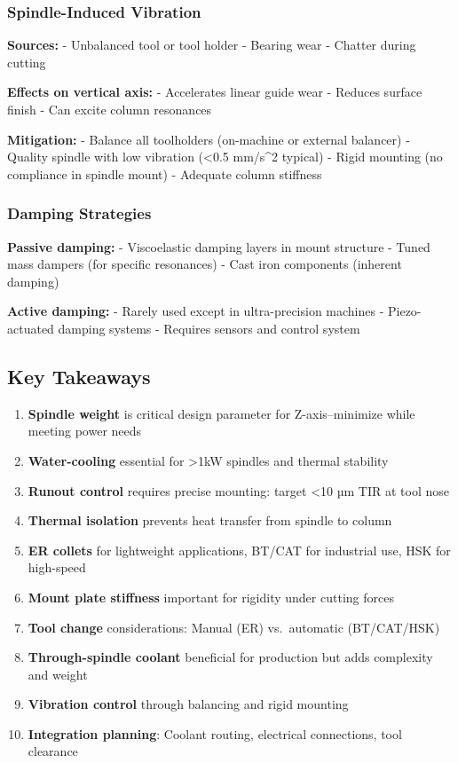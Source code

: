 \documentclass[
]{article}
\providecommand{\tightlist}{%
  \setlength{\itemsep}{0pt}\setlength{\parskip}{0pt}}
\begin{document}
\subsubsection{Spindle-Induced
Vibration}\label{spindle-induced-vibration}

\textbf{Sources:} - Unbalanced tool or tool holder - Bearing wear -
Chatter during cutting

\textbf{Effects on vertical axis:} - Accelerates linear guide wear -
Reduces surface finish - Can excite column resonances

\textbf{Mitigation:} - Balance all toolholders (on-machine or external
balancer) - Quality spindle with low vibration (\textless0.5 mm/s\^{}2
typical) - Rigid mounting (no compliance in spindle mount) - Adequate
column stiffness

\subsubsection{Damping Strategies}\label{damping-strategies}

\textbf{Passive damping:} - Viscoelastic damping layers in mount
structure - Tuned mass dampers (for specific resonances) - Cast iron
components (inherent damping)

\textbf{Active damping:} - Rarely used except in ultra-precision
machines - Piezo-actuated damping systems - Requires sensors and control
system

\subsection{Key Takeaways}\label{key-takeaways-4}

\begin{enumerate}
\def\labelenumi{\arabic{enumi}.}
\tightlist
\item
  \textbf{Spindle weight} is critical design parameter for
  Z-axis--minimize while meeting power needs
\item
  \textbf{Water-cooling} essential for \textgreater1kW spindles and
  thermal stability
\item
  \textbf{Runout control} requires precise mounting: target \textless10
  µm TIR at tool nose
\item
  \textbf{Thermal isolation} prevents heat transfer from spindle to
  column
\item
  \textbf{ER collets} for lightweight applications, BT/CAT for
  industrial use, HSK for high-speed
\item
  \textbf{Mount plate stiffness} important for rigidity under cutting
  forces
\item
  \textbf{Tool change} considerations: Manual (ER) vs.~automatic
  (BT/CAT/HSK)
\item
  \textbf{Through-spindle coolant} beneficial for production but adds
  complexity and weight
\item
  \textbf{Vibration control} through balancing and rigid mounting
\item
  \textbf{Integration planning}: Coolant routing, electrical
  connections, tool clearance
\end{enumerate}
\end{document}
